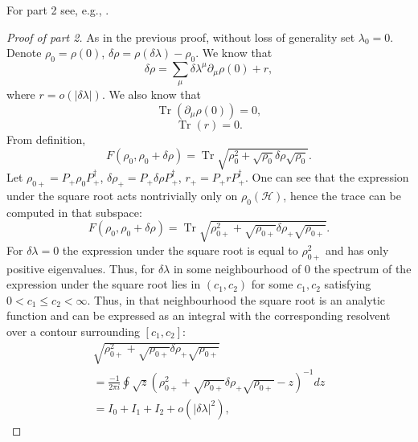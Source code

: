 \documentclass[
  american,aps,pra,reprint,floatfix,nofootinbib,superscriptaddress
]{revtex4-2}
\DeclareMathOperator{\Tr}{Tr}
\newcommand{\abs}[1]{\left|#1\right|}
\begin{document}
For part 2 see, e.g., \cite[section 15.1]{bengtsson_zyczkowski_2017}.
\begin{proof}[Proof of part 2]
  As in the previous proof, without loss of generality set $\lambda_0 = 0$.
  Denote $\rho_0 = \rho(0)$, $\delta \rho = \rho(\delta \lambda) - \rho_0$.
  We know that
  \begin{equation}
    \delta \rho = \sum_{\mu} \delta\lambda^\mu \partial_\mu\rho(0) + r,
  \end{equation}
  where $r = o(\abs{\delta \lambda})$. We also know that
  \begin{equation}
    \Tr\left(\partial_\mu\rho(0)\right) = 0,
  \end{equation}
  \begin{equation}
    \Tr(r) = 0.
  \end{equation}
  From definition,
  \begin{equation}
    F(\rho_0, \rho_0 + \delta \rho) =
    \Tr \sqrt{\rho_0^2 + \sqrt{\rho_0} \delta \rho \sqrt{\rho_0}}.
  \end{equation}
  Let $\rho_{0{+}} = P_{{+}} \rho_0 P_{{+}}^{\dagger}$,
  $\delta\rho_{+} = P_{{+}} \delta\rho P_{{+}}^{\dagger}$,
  $r_{+} = P_{{+}} r P_{{+}}^{\dagger}$. One can see that the expression under the
  square root acts nontrivially only on $\rho_0(\mathcal{H})$, hence the trace
  can be computed in that subspace:
  \begin{equation}
    \label{eq:F.Tr.sqrt}
    F(\rho_0, \rho_0 + \delta \rho) = \Tr \sqrt{
      \rho_{0{+}}^2 + \sqrt{\rho_{0{+}}} \delta \rho_{+} \sqrt{\rho_{0{+}}}
    }.
  \end{equation}
  For $\delta \lambda = 0$ the expression under the square root is equal to
  $\rho_{0{+}}^2$ and has only positive eigenvalues. Thus, for $\delta \lambda$
  in some neighbourhood of $0$ the spectrum of the expression under the square
  root lies in $(c_1, c_2)$ for some $c_1,c_2$ satisfying
  $0 < c_1 \leq c_2 < \infty$. Thus, in that neighbourhood the square root is
  an analytic function and can be expressed as an integral with the
  corresponding resolvent over a contour surrounding $[c_1, c_2]$:
  \begin{multline}
    \label{eq:oint}
    \sqrt{
      \rho_{0{+}}^2 + \sqrt{\rho_{0{+}}} \delta \rho_{+} \sqrt{\rho_{0{+}}}
    } \\
    = \frac{-1}{2\pi i} \oint \sqrt{z} \left(
      \rho_{0{+}}^2 + \sqrt{\rho_{0{+}}} \delta \rho_{+} \sqrt{\rho_{0{+}}} - z
    \right)^{-1} dz \\
    = I_0 + I_1 + I_2 + o(\abs{\delta \lambda}^2),

\end{multline}
\end{proof}
\end{document}
